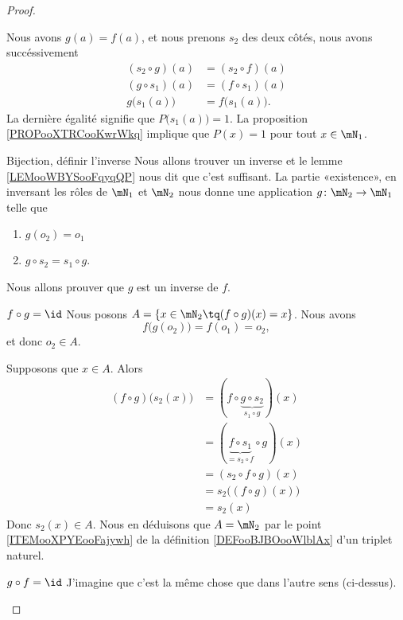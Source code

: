 \begin{proof}
\begin{subproof}
		Nous avons \( g(a)=f(a)\), et nous prenons \( s_2\) des deux côtés, nous avons succéssivement
		\begin{subequations}
			\begin{align}
				(s_2\circ g)(a)     & =(s_2\circ f)(a)      \\
				(g\circ s_1)(a)     & =(f\circ s_1)(a)      \\
				g\big( s_1(a) \big) & =f\big( s_1(a) \big).
			\end{align}
		\end{subequations}
		La dernière égalité signifie que \( P\big( s_1(a) \big)=1\). La proposition \ref{PROPooXTRCooKwrWkq} implique que \( P(x)=1\) pour tout \( x\in \mN_1\).
		\item[Bijection, définir l'inverse]
		Nous allons trouver un inverse et le lemme \ref{LEMooWBYSooFqyqQP} nous dit que c'est suffisant. La partie «existence», en inversant les rôles de \( \mN_1\) et \( \mN_2\) nous donne une application \( g\colon \mN_2\to \mN_1\) telle que
		\begin{enumerate}
			\item
			      \( g(o_2)=o_1\)
			\item
			      \( g\circ s_2=s_1\circ g\).
		\end{enumerate}
		Nous allons prouver que \( g\) est un inverse de \( f\).
		\item[\( f\circ g=\id\)]
		Nous posons \( A=\{ x\in \mN_2\tq (f\circ g)(x)=x \}\). Nous avons
		\begin{equation}
			f\big( g(o_2) \big)=f(o_1)=o_2,
		\end{equation}
		et donc \( o_2\in A\).

		Supposons que \( x\in A\). Alors
		\begin{subequations}
			\begin{align}
				(f\circ g)\big( s_2(x) \big) & =(f\circ \underbrace{g\circ s_2}_{s_1\circ g})(x)  \\
				                             & =(\underbrace{f\circ s_1}_{=s_2\circ f}\circ g)(x) \\
				                             & =(s_2\circ f\circ g)(x)                            \\
				                             & =s_2\big( (f\circ g)(x) \big)                      \\
				                             & =s_2(x)
			\end{align}
		\end{subequations}
		Donc \( s_2(x)\in A\). Nous en déduisons que \( A=\mN_2\) par le point \ref{ITEMooXPYEooFajywh} de la définition \ref{DEFooBJBOooWlblAx} d'un triplet naturel.
		\item[\( g\circ f=\id\)]
		J'imagine que c'est la même chose que dans l'autre sens (ci-dessus).
	\end{subproof}
\end{proof}

